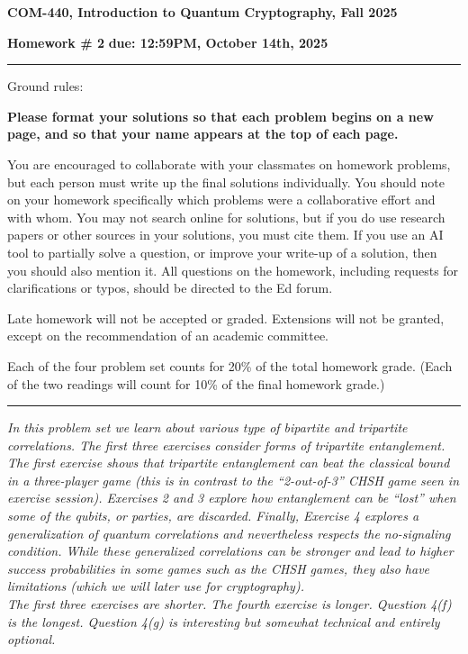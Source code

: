 \documentclass[12pt]{article}
\newcommand{\header}[1]{\begin{center} {\large\bf #1} \end{center}}
\begin{document}
\header{COM-440, Introduction to Quantum Cryptography, Fall 2025}
{\bf Homework \# 2} \hfill {\bf due: 12:59PM, October 14th, 2025}


\medskip

\hrule

\medskip 

Ground rules: 

{\bf Please
  format your solutions so that each problem begins on a new page, and
  so that your name appears at the top of each page.}

You are encouraged to collaborate with your classmates on
homework problems, but each person must write up the final solutions
individually. You should note on your homework specifically which
problems were a collaborative effort and with whom. You may not search
online for solutions, but if you do use research papers or other
sources in your solutions, you must cite them. If you use an AI tool to 
partially solve a question, or improve your write-up of a solution, then 
you should also mention it. All questions on the homework, including requests for clarifications or typos, should be directed to the Ed forum.

Late homework will not be accepted or graded. Extensions will not be granted, except on the recommendation of an academic committee. 

Each of the four problem set counts for 20\% of the total homework grade. (Each of the two readings will count for 10\% of the final homework grade.)


\medskip

\hrule

\medskip

\emph{In this problem set we learn about various type of bipartite and tripartite correlations. The first three exercises consider forms of tripartite entanglement. The first exercise shows that tripartite entanglement can beat the classical bound in a three-player game (this is in contrast to the ``2-out-of-3'' CHSH game seen in exercise session). Exercises 2 and 3 explore how entanglement can be ``lost'' when some of the qubits, or parties, are discarded. Finally, Exercise 4 explores a generalization of quantum correlations and nevertheless respects the no-signaling condition. While these generalized correlations can be stronger and lead to higher success probabilities in some games such as the CHSH games, they also have limitations (which we will later use for cryptography).\\
The first three exercises are shorter. The fourth exercise is longer. Question 4(f) is the longest. Question 4(g) is interesting but somewhat technical and entirely optional.}
\end{document}
